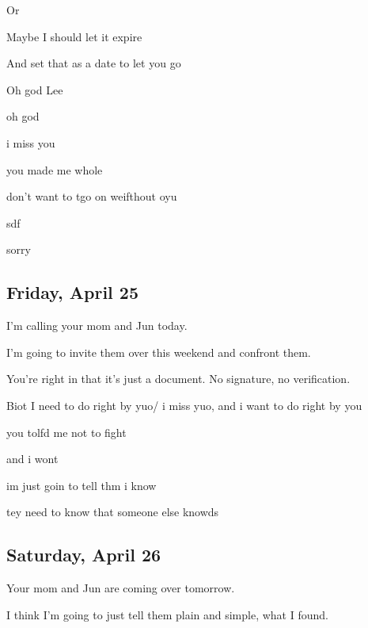 { Or

 Maybe I should let it expire

 And set that as a date to let you go

 Oh god Lee

 oh god

 i miss you

 you made me whole

 don't want to tgo on weifthout oyu

 sdf

 sorry

\newpage

\subsection*{Friday, April 25}\label{friday-april-25}

 I'm calling your mom and Jun today.

 I'm going to invite them over this weekend and confront them.

 You're right in that it's just a document. No signature, no verification.

 Biot I need to do right by yuo/ i miss yuo, and i want to do right by you

 you tolfd me not to fight

 and i wont

 im just goin to tell thm i know

 tey need to know that someone else knowds

\newpage

\subsection*{Saturday, April 26}\label{saturday-april-26}

 Your mom and Jun are coming over tomorrow.

 I think I'm going to just tell them plain and simple, what I found.

}
